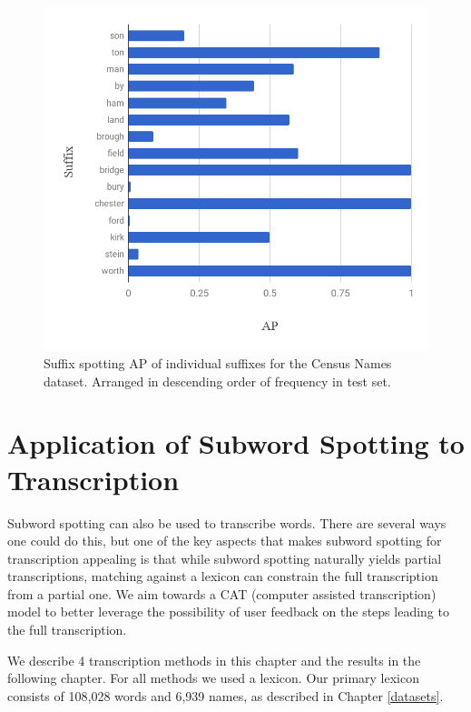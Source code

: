 \documentclass[ms,electronic,twosidetoc,letterpaper,chaptercenter,parttop,lof,lot]{byumsphd}
\begin{document}
\begin{figure}
    \centering
    \includegraphics[width=.75\textwidth]{suffix_names_ap}
    \caption{Suffix spotting AP of individual suffixes for the Census Names dataset. Arranged in descending order of frequency in test set.}
    \label{fig:names_suffix}
\end{figure}





\chapter{Application of Subword Spotting to Transcription}\label{transcription}

Subword spotting can also be used to transcribe words. There are several ways one could do this, but one of the key aspects that makes subword spotting for transcription appealing is that while subword spotting naturally yields partial transcriptions, matching against a lexicon can constrain the full transcription from a partial one. We aim towards a CAT (computer assisted transcription) model to better leverage the possibility of user feedback on the steps leading to the full transcription.

We describe 4 transcription methods in this chapter and the results in the following chapter.
For all methods we used a lexicon. Our primary lexicon consists of 108,028 words and 6,939 names, as described in Chapter \ref{datasets}.
\end{document}
